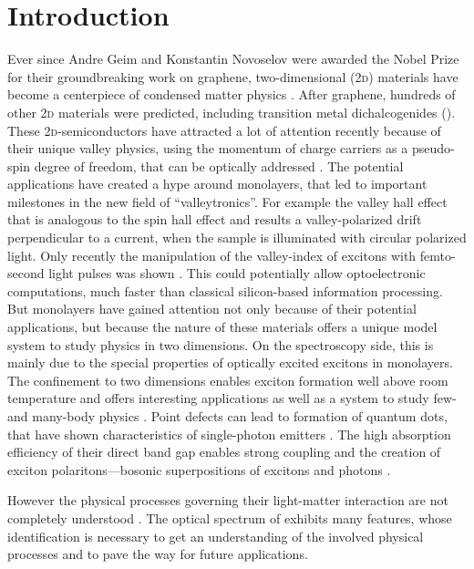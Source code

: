 \chapter{Introduction}
Ever since Andre Geim and Konstantin Novoselov were awarded the Nobel Prize for their groundbreaking work on graphene, two-dimensional (2\textsc{d}) materials have become a centerpiece of condensed matter physics \cite{novoselov_electric_2004}. After graphene, hundreds of other 2\textsc{d} materials were predicted, including transition metal dichalcogenides (\tmds\!). These 2\textsc{d}-semiconductors have attracted a lot of attention recently because of their unique valley physics, using the momentum of charge carriers as a pseudo-spin degree of freedom, that can be optically addressed \cite{wang_electronics_2012}. The potential applications have created a hype around \tmdg monolayers, that led to important milestones in the new field of ``valleytronics''. For example the valley hall effect \cite{mak_valley_2014} that is analogous to the spin hall effect and results a valley-polarized drift perpendicular to a current, when the sample is illuminated with circular polarized light. Only recently the manipulation of the valley-index of excitons with femto-second light pulses was shown \cite{langer_lightwave_2018}. This could potentially allow optoelectronic computations, much faster than classical silicon-based information processing. But \tmdg monolayers have gained attention not only because of their potential applications, but because the nature of these materials offers a unique model system to study physics in two dimensions. On the spectroscopy side, this is mainly due to the special properties of optically excited excitons in \tmdg monolayers. The confinement to two dimensions enables exciton formation well above room temperature and offers interesting applications as well as a system to study few- and many-body physics \cite{chernikov_exciton_2014}. Point defects can lead to formation of quantum dots, that have shown characteristics of single-photon emitters \cite{srivastava_optically_2015}. The high absorption efficiency of their direct band gap enables strong coupling and the creation of exciton polaritons---bosonic superpositions of excitons and photons \cite{liu_control_2017,zhang_photonic-crystal_2018}.

However the physical processes governing their light-matter interaction are not completely understood \cite{koperski_optical_2017}. The optical spectrum of \tmds exhibits many features, whose identification is necessary to get an understanding of the involved physical processes and to pave the way for future applications. 

